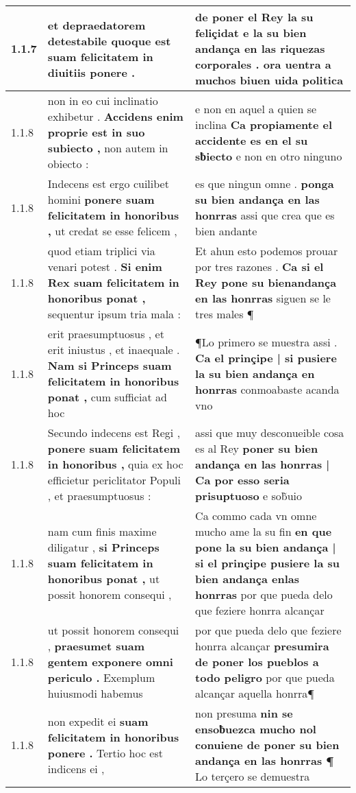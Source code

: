 \begin{tabular}{|p{1cm}|p{6.5cm}|p{6.5cm}|}
1.1.7 & et depraedatorem detestabile \textbf{ quoque est suam felicitatem } in diuitiis ponere . & de poner el Rey la su feliçidat \textbf{ e la su bien andança en las riquezas corporales . } ora uentra a muchos biuen uida politica \\\hline
1.1.8 & non in eo cui inclinatio exhibetur . \textbf{ Accidens enim proprie est in suo subiecto , } non autem in obiecto : & e non en aquel a quien se inclina \textbf{ Ca propiamente el accidente es en el su sƀiecto } e non en otro ninguno \\\hline
1.1.8 & Indecens est ergo cuilibet homini \textbf{ ponere suam felicitatem in honoribus , } ut credat se esse felicem , & es que ningun omne . \textbf{ ponga su bien andança en las honrras } assi que crea que es bien andante \\\hline
1.1.8 & quod etiam triplici via venari potest . \textbf{ Si enim Rex suam felicitatem in honoribus ponat , } sequentur ipsum tria mala : & Et ahun esto podemos prouar por tres razones . \textbf{ Ca si el Rey pone su bienandança en las honrras } siguen se le tres males ¶ \\\hline
1.1.8 & erit praesumptuosus , et erit iniustus , et inaequale . \textbf{ Nam si Princeps suam felicitatem in honoribus ponat , } cum sufficiat ad hoc & ¶Lo primero se muestra assi . \textbf{ Ca el prinçipe | si pusiere la su bien andança en honrras } conmoabaste acanda vno \\\hline
1.1.8 & Secundo indecens est Regi , \textbf{ ponere suam felicitatem in honoribus , } quia ex hoc efficietur periclitator Populi , et praesumptuosus : & assi que muy desconueible cosa es al Rey \textbf{ poner su bien andança en las honrras | Ca por esso seria prisuptuoso } e sob̃uio \\\hline
1.1.8 & nam cum finis maxime diligatur , \textbf{ si Princeps suam felicitatem in honoribus ponat , } ut possit honorem consequi , & Ca commo cada vn omne mucho ame la su fin \textbf{ en que pone la su bien andança | si el prinçipe pusiere la su bien andança enlas honrras } por que pueda delo que feziere honrra alcançar \\\hline
1.1.8 & ut possit honorem consequi , \textbf{ praesumet suam gentem exponere omni periculo . } Exemplum huiusmodi habemus & por que pueda delo que feziere honrra alcançar \textbf{ presumira de poner los pueblos a todo peligro } por que pueda alcançar aquella honrra¶ \\\hline
1.1.8 & non expedit ei \textbf{ suam felicitatem in honoribus ponere . } Tertio hoc est indicens ei , & non presuma \textbf{ nin se ensoƀuezca mucho nol conuiene de poner su bien andança en las honrras ¶ } Lo terçero se demuestra \\\hline

\end{tabular}
